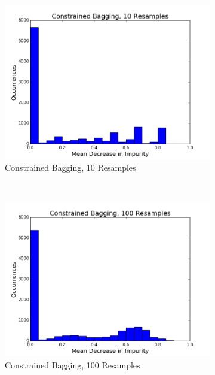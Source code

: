 \begin{figure}[H]
  ~
  \begin{subfigure}[b]{0.45\textwidth}
    \includegraphics[width=\textwidth]{figures/random_forests/bagging_bias_constrained_bagging_hist_10.png}
    \caption{Constrained Bagging, 10 Resamples}
    \label{fig:bagging-bias-constrained-10}
  \end{subfigure}
  ~
  \begin{subfigure}[b]{0.45\textwidth}
    \includegraphics[width=\textwidth]{figures/random_forests/bagging_bias_constrained_bagging_hist_100.png}
    \caption{Constrained Bagging, 100 Resamples}
    \label{fig:bagging-bias-constrained-100}
  \end{subfigure}
  ~
  \begin{subfigure}[b]{0.45\textwidth}

\end{subfigure}
\end{figure}
